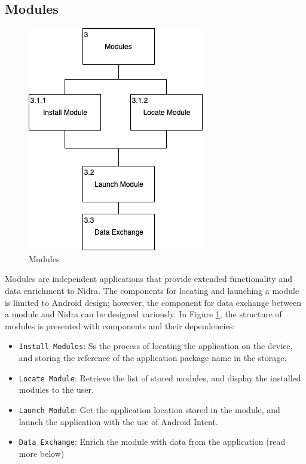 \subsection{Modules}

\begin{figure}
    \centering
    \includegraphics[scale=0.6]{images/Modules.png}
    \caption{Modules}
    \label{fig:hta_modules}
\end{figure}

Modules are independent applications that provide extended functionality and data enrichment to Nidra. The components for locating and launching a module is limited to Android design; however, the component for data exchange between a module and Nidra can be designed variously.  In Figure \ref{fig:hta_modules}, the structure of modules is presented with components and their dependencies:   

\begin{itemize}
    \item[3.1.1] \verb|Install Modules|: Ss the process of locating the application on the device, and storing the reference of the application package name in the storage.  
    \item[3.1.2] \verb|Locate Module|: Retrieve the list of stored modules, and display the installed modules to the user. 
    \item[3.2] \verb|Launch Module|: Get the application location stored in the module, and launch the application with the use of Android Intent. 
    \item[3.3] \verb|Data Exchange|: Enrich the module with data from the application (read more below)
\end{itemize}

